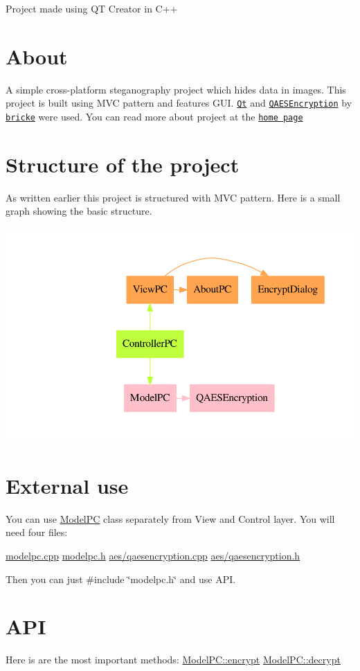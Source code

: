 Project made using QT Creator in C++\hypertarget{index_about}{}\section{About}\label{index_about}
A simple cross-\/platform steganography project which hides data in images. This project is built using M\+VC pattern and features G\+UI. \href{https://qt.io}{\tt Qt} and \href{https://github.com/bricke/Qt-AES}{\tt Q\+A\+E\+S\+Encryption} by \href{https://github.com/bricke}{\tt bricke} were used. You can read more about project at the \href{../}{\tt home page}\hypertarget{index_structure}{}\section{Structure of the project}\label{index_structure}
As written earlier this project is structured with M\+VC pattern. Here is a small graph showing the basic structure. 
\begin{DoxyImageNoCaption}
  \mbox{\includegraphics[width=\textwidth,height=\textheight/2,keepaspectratio=true]{dot_structure}}
\end{DoxyImageNoCaption}
\hypertarget{index_ext-use}{}\section{External use}\label{index_ext-use}
You can use \hyperlink{class_model_p_c}{Model\+PC} class separately from View and Control layer. You will need four files\+:

\hyperlink{modelpc_8cpp}{modelpc.\+cpp} \hyperlink{modelpc_8h}{modelpc.\+h} \hyperlink{qaesencryption_8cpp}{aes/qaesencryption.\+cpp} \hyperlink{qaesencryption_8h}{aes/qaesencryption.\+h}

Then you can just {\ttfamily \#include \char`\"{}modelpc.\+h\char`\"{}} and use A\+PI.\hypertarget{index_use_api}{}\section{A\+PI}\label{index_use_api}
Here is are the most important methods\+: \hyperlink{class_model_p_c_a6f191f62d4635d0d3555fcc0be298794}{Model\+P\+C\+::encrypt} \hyperlink{class_model_p_c_a5995215a34a1e1f504035715a8013809}{Model\+P\+C\+::decrypt}